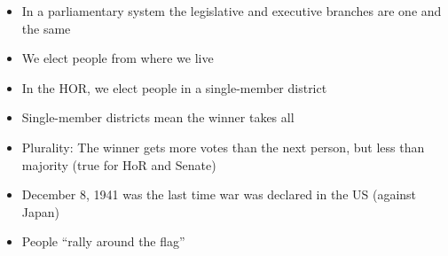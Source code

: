 \documentclass[12pt]{article}
\begin{document}
\begin{itemize}
  \item In a parliamentary system the legislative and executive branches are one and the same

  \item We elect people from where we live

  \item In the HOR, we elect people in a single-member district

  \item Single-member districts mean the winner takes all

  \item Plurality: The winner gets more votes than the next person, but less than majority (true for HoR and Senate)

  \item December 8, 1941 was the last time war was declared in the US (against Japan)

  \item People “rally around the flag”

\end{itemize}
\end{document}
